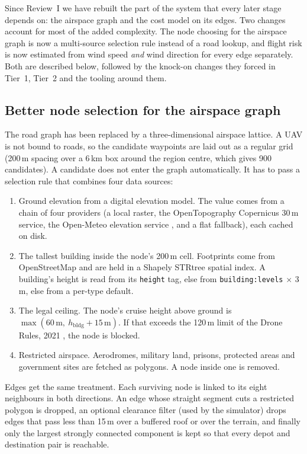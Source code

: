 \documentclass{ssnreview}
\begin{document}
Since Review~I we have rebuilt the part of the system that every later stage depends on:
the airspace graph and the cost model on its edges. Two changes account for most of the
added complexity. The node choosing for the airspace graph is now a multi-source selection
rule instead of a road lookup, and flight risk is now estimated from wind speed
\emph{and} wind direction for every edge separately. Both are described below, followed
by the knock-on changes they forced in Tier~1, Tier~2 and the tooling around them.

\subsection{Better node selection for the airspace graph}

The road graph has been replaced by a three-dimensional airspace lattice. A UAV is not
bound to roads, so the candidate waypoints are laid out as a regular grid (200\,m spacing
over a 6\,km box around the region centre, which gives 900 candidates). A candidate
does not enter the graph automatically. It has to pass a selection rule that combines
four data sources:

\begin{enumerate}[label=(\roman*)]
  \item Ground elevation from a digital elevation model. The value comes from a chain of
  four providers (a local raster, the OpenTopography Copernicus 30\,m service, the
  Open-Meteo elevation service \cite{r20}, and a flat fallback), each cached on disk.
  \item The tallest building inside the node's 200\,m cell. Footprints come from
  OpenStreetMap and are held in a Shapely STRtree spatial index. A building's height is
  read from its \texttt{height} tag, else from \texttt{building:levels}$\,\times\,$3\,m,
  else from a per-type default.
  \item The legal ceiling. The node's cruise height above ground is
  $\max(60\,\mathrm{m},\ h_\mathrm{bldg} + 15\,\mathrm{m})$. If that exceeds the
  120\,m limit of the Drone Rules, 2021 \cite{r21}, the node is blocked.
  \item Restricted airspace. Aerodromes, military land, prisons, protected areas and
  government sites are fetched as polygons. A node inside one is removed.
\end{enumerate}

Edges get the same treatment. Each surviving node is linked to its eight neighbours in
both directions. An edge whose straight segment cuts a restricted polygon is dropped, an
optional clearance filter (used by the simulator) drops edges that pass less than 15\,m
over a buffered roof or over the terrain, and finally only the largest strongly
connected component is kept so that every depot and destination pair is reachable.
\end{document}
